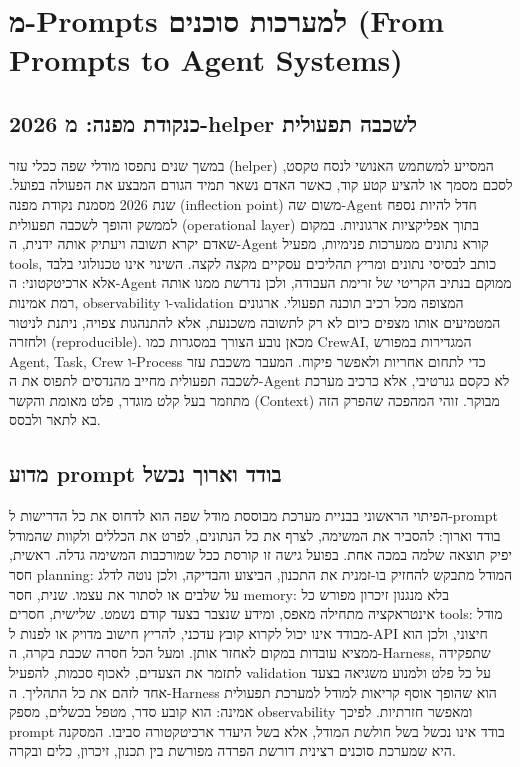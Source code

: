 \chapter{מ-Prompts למערכות סוכנים (From Prompts to Agent Systems)}
\section{2026 כנקודת מפנה: מ-helper לשכבה תפעולית}
במשך שנים נתפסו מודלי שפה ככלי עזר (helper) המסייע למשתמש האנושי לנסח טקסט, לסכם מסמך או להציע קטע קוד, כאשר האדם נשאר תמיד הגורם המבצע את הפעולה בפועל. שנת 2026 מסמנת נקודת מפנה (inflection point) משום שה-Agent חדל להיות נספח לממשק והופך לשכבה תפעולית (operational layer) בתוך אפליקציות ארגוניות. במקום שאדם יקרא תשובה ויעתיק אותה ידנית, ה-Agent קורא נתונים ממערכות פנימיות, מפעיל tools, כותב לבסיסי נתונים ומריץ תהליכים עסקיים מקצה לקצה. השינוי אינו טכנולוגי בלבד אלא ארכיטקטוני: ה-Agent ממוקם בנתיב הקריטי של זרימת העבודה, ולכן נדרשת ממנו אותה רמת אמינות, observability ו-validation המצופה מכל רכיב תוכנה תפעולי. ארגונים המטמיעים אותו מצפים כיום לא רק לתשובה משכנעת, אלא להתנהגות צפויה, ניתנת לניטור ולחזרה (reproducible). מכאן נובע הצורך במסגרות כמו CrewAI, המגדירות במפורש Agent, Task, Crew ו-Process כדי לתחום אחריות ולאפשר פיקוח. המעבר משכבת עזר לשכבה תפעולית מחייב מהנדסים לתפוס את ה-Agent לא כקסם גנרטיבי, אלא כרכיב מערכת מתוזמר בעל קלט מוגדר, פלט מאומת והקשר (Context) מבוקר. זוהי המהפכה שהפרק הזה בא לתאר ולבסס.

\section{מדוע prompt בודד וארוך נכשל}
הפיתוי הראשוני בבניית מערכת מבוססת מודל שפה הוא לדחוס את כל הדרישות ל-prompt בודד וארוך: להסביר את המשימה, לצרף את כל הנתונים, לפרט את הכללים ולקוות שהמודל יפיק תוצאה שלמה במכה אחת. בפועל גישה זו קורסת ככל שמורכבות המשימה גדלה. ראשית, חסר planning: המודל מתבקש להחזיק בו-זמנית את התכנון, הביצוע והבדיקה, ולכן נוטה לדלג על שלבים או לסתור את עצמו. שנית, חסר memory: בלא מנגנון זיכרון מפורש כל אינטראקציה מתחילה מאפס, ומידע שנצבר בצעד קודם נשמט. שלישית, חסרים tools: מודל מבודד אינו יכול לקרוא קובץ עדכני, להריץ חישוב מדויק או לפנות ל-API חיצוני, ולכן הוא ממציא עובדות במקום לאחזר אותן. ומעל הכל חסרה שכבת בקרה, ה-Harness, שתפקידה לתזמר את הצעדים, לאכוף סכמות, להפעיל validation על כל פלט ולמנוע משגיאה בצעד אחד לזהם את כל התהליך. ה-Harness הוא שהופך אוסף קריאות למודל למערכת תפעולית אמינה: הוא קובע סדר, מטפל בכשלים, מספק observability ומאפשר חזרתיות. לפיכך prompt בודד אינו נכשל בשל חולשת המודל, אלא בשל היעדר ארכיטקטורה סביבו. המסקנה היא שמערכת סוכנים רצינית דורשת הפרדה מפורשת בין תכנון, זיכרון, כלים ובקרה.

